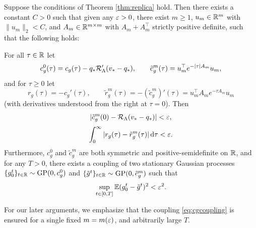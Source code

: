 \begin{corollary}\label{cor:semigroupapprox}
Suppose the conditions of Theorem \ref{thm:replica} hold.
Then there exists a constant $C>0$ such that
given any $\varepsilon>0$, there exist $m \geq 1$, 
$u_m \in \mathbb{R}^m$ with $\|u_m\|_2<C$, and $A_m \in \mathbb{R}^{m \times m}$ with
$A_m+A_m^\top$ strictly positive definite, such that the following holds:

For all $\tau \in \mathbb{R}$ let
\[c_g^0(\tau)=c_g(\tau)-q_*\mathcal{R}_\Lambda'(v_*-q_*),
\qquad \tilde c_g^m(\tau)=u_m^\top e^{-|\tau|A_m}u_m,\]
and for $\tau \geq 0$ let
\[r_g(\tau)=-c_g'(\tau),
\qquad \tilde r_g^m(\tau)=-(\tilde c_g^m)'(\tau)
=u_m^\top A_me^{-\tau A_m}u_m\]
(with derivatives understood from the right at $\tau=0$). Then
\begin{equation}\label{eq:cg0approx}
|\tilde c_g^m(0)-\mathcal{R}_{\Lambda}(v_*-q_*)|<\varepsilon,
\end{equation}
\begin{equation}\label{eq:rgapprox}
\int_0^\infty |r_g(\tau)-\tilde r_g^m(\tau)|\,\mathrm{d} \tau<\varepsilon.
\end{equation}
Furthermore, $c_g^0$ and $\tilde c_g^m$ are both symmetric and
positive-semidefinite on $\mathbb{R}$, and for any $T>0$,
there exists a coupling of two stationary Gaussian processes
$\{g_0^t\}_{t \in \mathbb{R}} \sim \operatorname{GP}(0,c_g^0)$ and $\{\tilde g^t\}_{t \in \mathbb{R}}
\sim \operatorname{GP}(0,\tilde c_g^m)$ such that
\begin{equation}\label{eq:cgcoupling}
\sup_{t \in [0,T]} \mathbb{E}(g_0^t-\tilde g^t)^2<\varepsilon^2.
\end{equation}
\end{corollary}
For our later arguments, we emphasize that the coupling \eqref{eq:cgcoupling} is
ensured for a single fixed $m=m(\varepsilon)$, and arbitrarily large $T$.

